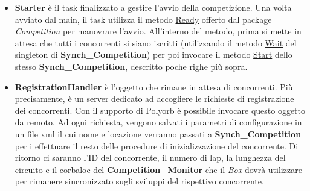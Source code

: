 \begin{itemize}
\item \textbf{Starter} \`{e} il task finalizzato a gestire l'avvio della competizione. Una volta avviato dal main, il task utilizza il metodo \underline{Ready}
offerto dal package \emph{Competition} per manovrare l'avvio. All'interno del metodo, prima si mette in attesa che tutti i concorrenti
si siano iscritti (utilizzando il metodo \underline{Wait} del singleton di \textbf{Synch\_Competition}) per poi invocare il metodo \underline{Start} dello
stesso \textbf{Synch\_Competition}, descritto poche righe pi\`{u} sopra.
\item \textbf{RegistrationHandler} \`{e} l'oggetto che rimane in attesa di concorrenti. Pi\`{u} precisamente, \`{e} un server dedicato ad accogliere
le richieste di registrazione dei concorrenti. Con il supporto di Polyorb \`{e} possibile invocare questo oggetto da remoto. Ad ogni richiesta,
vengono salvati i parametri di configurazione in un file xml il cui nome e locazione verranno passati a \textbf{Synch\_Competition} per
i effettuare il resto delle procedure di inizializzazione del concorrente. Di ritorno ci saranno l'ID del concorrente, il numero di lap,
la lunghezza del circuito e il corbaloc 
del \textbf{Competition\_Monitor} che il \emph{Box} dovr\`{a} utilizzare per rimanere sincronizzato sugli sviluppi del rispettivo concorrente.
\end{itemize}
